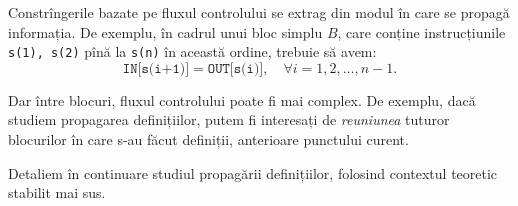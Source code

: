 Constrîngerile bazate pe fluxul controlului se extrag din modul
în care se propagă in\-for\-mația. De exemplu, în cadrul unui bloc simplu $ B $,
care conține instrucțiunile \texttt{s(1), s(2)} pînă la \texttt{s(n)} în această ordine,
trebuie să avem:
\[
  \texttt{IN[s(i+1)]} = \texttt{OUT[s(i)]}, \quad \forall i = 1, 2, \dots, n-1.
\]

Dar între blocuri, fluxul controlului poate fi mai complex. De exemplu,
dacă studiem propagarea definițiilor, putem fi interesați de \emph{reuniunea}
tuturor blocurilor în care s-au făcut definiții, anterioare punctului curent.

\vspace{0.5cm}

Detaliem în continuare studiul propagării definițiilor, folosind contextul
teoretic stabilit mai sus.

